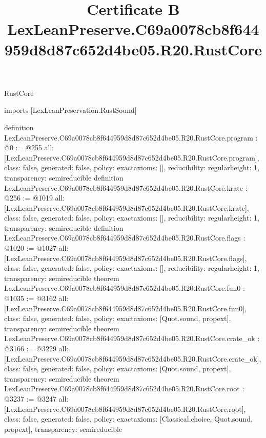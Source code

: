 \begin{lexlean}{RustCore}
\title{Certificate B LexLeanPreserve.C69a0078cb8f644959d8d87c652d4be05.R20.RustCore}
\begin{coremodule}
imports [LexLeanPreservation.RustSound]

definition LexLeanPreserve.C69a0078cb8f644959d8d87c652d4be05.R20.RustCore.program : @0 := @255 {
  all: [LexLeanPreserve.C69a0078cb8f644959d8d87c652d4be05.R20.RustCore.program],
  class: false,
  generated: false,
  policy: exact{axioms: []},
  reducibility: regular{height: 1},
  transparency: semireducible
}
definition LexLeanPreserve.C69a0078cb8f644959d8d87c652d4be05.R20.RustCore.krate : @256 := @1019 {
  all: [LexLeanPreserve.C69a0078cb8f644959d8d87c652d4be05.R20.RustCore.krate],
  class: false,
  generated: false,
  policy: exact{axioms: []},
  reducibility: regular{height: 1},
  transparency: semireducible
}
definition LexLeanPreserve.C69a0078cb8f644959d8d87c652d4be05.R20.RustCore.flags : @1020 := @1027 {
  all: [LexLeanPreserve.C69a0078cb8f644959d8d87c652d4be05.R20.RustCore.flags],
  class: false,
  generated: false,
  policy: exact{axioms: []},
  reducibility: regular{height: 1},
  transparency: semireducible
}
theorem LexLeanPreserve.C69a0078cb8f644959d8d87c652d4be05.R20.RustCore.fun0 : @1035 := @3162 {
  all: [LexLeanPreserve.C69a0078cb8f644959d8d87c652d4be05.R20.RustCore.fun0],
  class: false,
  generated: false,
  policy: exact{axioms: [Quot.sound, propext]},
  transparency: semireducible
}
theorem LexLeanPreserve.C69a0078cb8f644959d8d87c652d4be05.R20.RustCore.crate_ok : @3166 := @3229 {
  all: [LexLeanPreserve.C69a0078cb8f644959d8d87c652d4be05.R20.RustCore.crate_ok],
  class: false,
  generated: false,
  policy: exact{axioms: [Quot.sound, propext]},
  transparency: semireducible
}
theorem LexLeanPreserve.C69a0078cb8f644959d8d87c652d4be05.R20.RustCore.root : @3237 := @3247 {
  all: [LexLeanPreserve.C69a0078cb8f644959d8d87c652d4be05.R20.RustCore.root],
  class: false,
  generated: false,
  policy: exact{axioms: [Classical.choice, Quot.sound, propext]},
  transparency: semireducible
}


\end{coremodule}
\end{lexlean}
